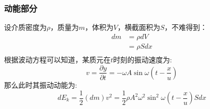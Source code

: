 \documentclass[lang=cn,a4paper,newtx]{elegantpaper}
\begin{document}
   \subsubsection{动能部分}
    设介质密度为$\rho$，质量为$m$，体积为$V$，横截面积为$S$，不难得到：
    \begin{equation}
      \begin{aligned}
        dm&=\rho dV\\
        &=\rho S dx\\
      \end{aligned}
    \end{equation}
    根据波动方程可以知道，某质元在$t$时刻的振动速度为:
    \begin{equation}
      v=\frac{\partial y}{\partial t}=-\omega A \sin \omega(t-\frac{x}{u})
    \end{equation}
    那么此时其振动动能为:
    \begin{equation}
      dE_k=\frac{1}{2}(dm)v^2=\frac{1}{2}\rho A^2 \omega^2 \sin^2 \omega(t-\frac{x}{u})Sdx
    \end{equation}
\end{document}
